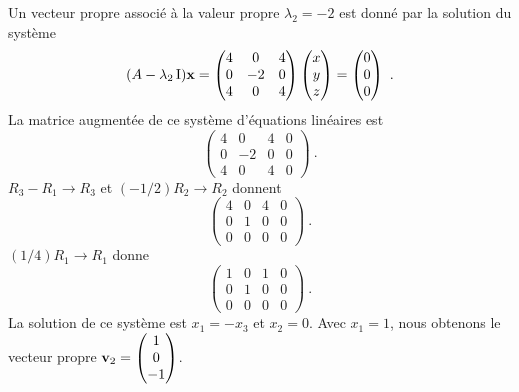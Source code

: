{Un vecteur propre
associé à la valeur propre $\lambda_2 = -2$ est donné par la solution
du système
\[
(A-\lambda_2\operatorname{I})\mathbf{x} = 
\begin{pmatrix}
4 & 0 & 4 \\0 & -2 & 0 \\4 & 0 & 4
\end{pmatrix}
\begin{pmatrix} x \\ y \\ z \end{pmatrix}
= \begin{pmatrix} 0 \\ 0 \\ 0 \end{pmatrix} \ .
\]
La matrice augmentée de ce système d'équations linéaires est
\[
\left(\begin{array}{ccc|c}
4 & 0 & 4 & 0 \\0 & -2 & 0 & 0 \\4 & 0 & 4 & 0 
\end{array}\right) \ .
\]
$R_3-R_1 \rightarrow R_3$ et $(-1/2)R_2 \rightarrow R_2$ donnent
\[
\left(\begin{array}{ccc|c}
4 & 0 & 4 & 0 \\ 0 & 1 & 0 & 0 \\ 0 & 0 & 0 & 0
\end{array}\right) \ .
\]
$(1/4)R_1 \rightarrow R_1$ donne
\[
\left(\begin{array}{ccc|c}
1 & 0 & 1 & 0 \\ 0 & 1 & 0 & 0 \\ 0 & 0 & 0 & 0
\end{array}\right) \ .
\]
La solution de ce système est $x_1=-x_3$ et $x_2=0$.  Avec $x_1=1$,
nous obtenons le vecteur propre
$\displaystyle \mathbf{v}_2 = \begin{pmatrix} 1 \\ 0 \\ -1 \end{pmatrix}$.

}
